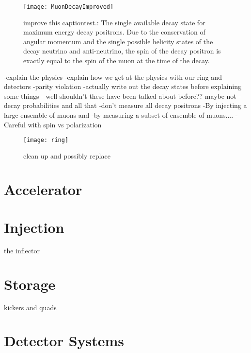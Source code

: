 \begin{figure}[]
    \centering
    \texttt{[image: MuonDecayImproved]}
    \caption[Muon Decay - Max Energy Positron]{improve this captiontest.: The single available decay state for maximum energy decay positrons. Due to the conservation of angular momentum and the single possible helicity states of the decay neutrino and anti-neutrino, the spin of the decay positron is exactly equal to the spin of the muon at the time of the decay.}
    \label{fig:MuonDecayImproved}
\end{figure}

-explain the physics
-explain how we get at the physics with our ring and detectors
-parity violation
-actually write out the decay states before explaining some things - well shouldn't these have been talked about before?? maybe not
-decay probabilities and all that
-don't measure all decay positrons
-By injecting a large ensemble of muons and 
-by measuring a subset of ensemble of muons....
-Careful with spin vs polarization





\begin{figure}[]
    \centering
    \texttt{[image: ring]}
    \caption[ring]{clean up and possibly replace}   
    \label{fig:ring}
\end{figure}


\section{Accelerator}
\label{sec:Accelerator}




\cite{Stratakis:2017uci}


\section{Injection}
\label{sec:Injection}

the inflector



\section{Storage}
\label{sec:Storage}

kickers and quads





\section{Detector Systems}
\label{sec:DetectorSystems}

